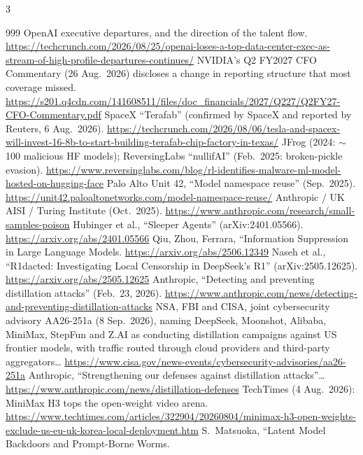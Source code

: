 \begin{multicols}{3}
\begin{thebibliography}{999}
 OpenAI executive departures, and the direction of the talent flow. \url{https://techcrunch.com/2026/08/25/openai-loses-a-top-data-center-exec-as-stream-of-high-profile-departures-continues/}
 NVIDIA's Q2 FY2027 CFO Commentary (26 Aug.\ 2026) discloses a change in reporting structure that most coverage missed. \url{https://s201.q4cdn.com/141608511/files/doc_financials/2027/Q227/Q2FY27-CFO-Commentary.pdf}
 SpaceX ``Terafab'' (confirmed by SpaceX and reported by Reuters, 6 Aug.\ 2026). \url{https://techcrunch.com/2026/08/06/tesla-and-spacex-will-invest-16-8b-to-start-building-terafab-chip-factory-in-texas/}
 JFrog (2024: $\sim$100 malicious HF models); ReversingLabs ``nullifAI'' (Feb.\ 2025: broken-pickle evasion). \url{https://www.reversinglabs.com/blog/rl-identifies-malware-ml-model-hosted-on-hugging-face}
 Palo Alto Unit 42, ``Model namespace reuse'' (Sep.\ 2025). \url{https://unit42.paloaltonetworks.com/model-namespace-reuse/}
 Anthropic / UK AISI / Turing Institute (Oct.\ 2025). \url{https://www.anthropic.com/research/small-samples-poison}
 Hubinger et al., ``Sleeper Agents'' (arXiv:2401.05566). \url{https://arxiv.org/abs/2401.05566}
 Qiu, Zhou, Ferrara, ``Information Suppression in Large Language Models. \url{https://arxiv.org/abs/2506.12349}
 Naseh et al., ``R1dacted: Investigating Local Censorship in DeepSeek's R1'' (arXiv:2505.12625). \url{https://arxiv.org/abs/2505.12625}
 Anthropic, ``Detecting and preventing distillation attacks'' (Feb.\ 23, 2026). \url{https://www.anthropic.com/news/detecting-and-preventing-distillation-attacks}
 NSA, FBI and CISA, joint cybersecurity advisory AA26-251a (8 Sep.\ 2026), naming DeepSeek, Moonshot, Alibaba, MiniMax, StepFun and Z.AI as conducting distillation campaigns against US frontier models, with traffic routed through cloud providers and third-party aggregators… \url{https://www.cisa.gov/news-events/cybersecurity-advisories/aa26-251a}
 Anthropic, ``Strengthening our defenses against distillation attacks''… \url{https://www.anthropic.com/news/distillation-defenses}
 TechTimes (4 Aug.\ 2026): MiniMax H3 tops the open-weight video arena. \url{https://www.techtimes.com/articles/322904/20260804/minimax-h3-open-weights-exclude-us-eu-uk-korea-local-deployment.htm}
 S.~Matsuoka, ``Latent Model Backdoors and Prompt-Borne Worms.

\end{thebibliography}
\end{multicols}
